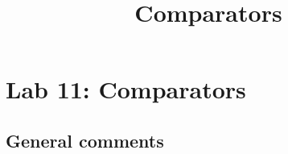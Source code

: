 \documentclass{article}
\title{Comparators}
\begin{document}
\maketitle

\section{Lab 11: Comparators}

\subsection*{General comments}

\begin{itemize}
\end{itemize}
\end{document}
